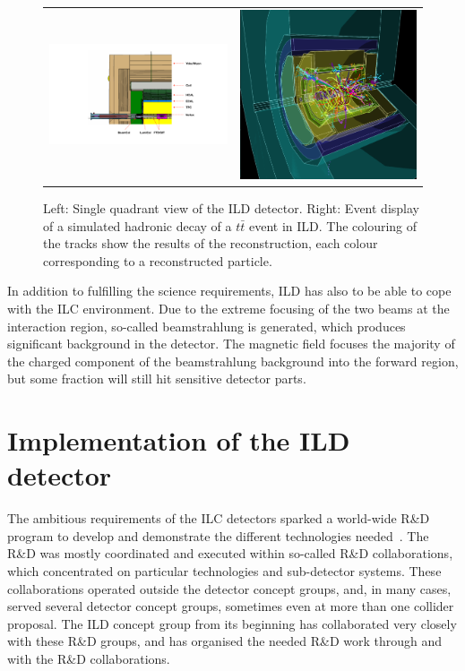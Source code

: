 \documentclass[%
 amsmath,amssymb,
 aps,
 longbibliography,
]{revtex4-1}
\begin{document}
\begin{figure}[tb]
 \begin{center}
 \begin{tabular}{lr}
 \includegraphics[width=0.48\hsize,clip]{figures/ILD_quadrant_new_lstar.pdf} & 
 \includegraphics[width=0.35\hsize]{figures/ttbar_500GeV_3dview-41.png}
 \\
 \end{tabular}
\caption{Left: Single quadrant view of the ILD detector. Right: Event display of a simulated hadronic decay of a $t \bar t$ event in ILD. The colouring of the tracks show the results of the reconstruction, each colour corresponding to a reconstructed particle.
\label{fig:ILD}}
 \end{center}
 \end{figure}

In addition to fulfilling the science requirements, ILD has also to be able to cope with the ILC environment. Due to the extreme focusing of the two beams at the interaction region, so-called beamstrahlung is generated, which produces significant background in the detector. The magnetic field focuses the majority of the charged component of the beamstrahlung background into the forward region, but some fraction will still hit sensitive detector parts. 



\section{Implementation of the ILD detector}
The ambitious requirements of the ILC detectors sparked a world-wide {{R\&D}} program to develop and demonstrate the different technologies needed~\cite{RDliaision}. The {{R\&D}} was mostly coordinated and executed within so-called {{R\&D}} collaborations, which concentrated on particular technologies and sub-detector systems. These collaborations operated outside the detector concept groups, and, in many cases, served several detector concept groups, sometimes even at more than one collider proposal. The ILD concept group from its beginning has collaborated very closely with these {{R\&D}} groups, and has organised the needed {{R\&D}} work through and with the {{R\&D}} collaborations. 
\end{document}
